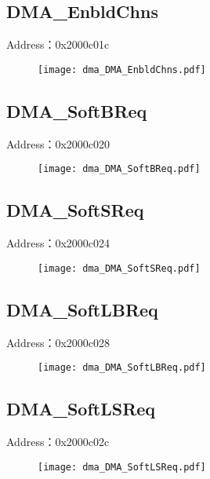 \subsection{DMA\_EnbldChns}
\label{dma-DMA-EnbldChns}
Address：0x2000c01c
 \begin{figure}[H]
\texttt{[image: dma\_DMA\_EnbldChns.pdf]}
\end{figure}

\subsection{DMA\_SoftBReq}
\label{dma-DMA-SoftBReq}
Address：0x2000c020
 \begin{figure}[H]
\texttt{[image: dma\_DMA\_SoftBReq.pdf]}
\end{figure}

\subsection{DMA\_SoftSReq}
\label{dma-DMA-SoftSReq}
Address：0x2000c024
 \begin{figure}[H]
\texttt{[image: dma\_DMA\_SoftSReq.pdf]}
\end{figure}

\subsection{DMA\_SoftLBReq}
\label{dma-DMA-SoftLBReq}
Address：0x2000c028
 \begin{figure}[H]
\texttt{[image: dma\_DMA\_SoftLBReq.pdf]}
\end{figure}

\subsection{DMA\_SoftLSReq}
\label{dma-DMA-SoftLSReq}
Address：0x2000c02c
 \begin{figure}[H]
\texttt{[image: dma\_DMA\_SoftLSReq.pdf]}
\end{figure}

